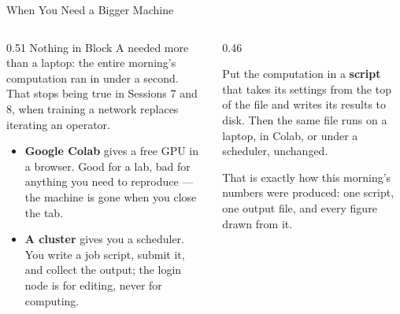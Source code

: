 \begin{frame}{When You Need a Bigger Machine}
\begin{columns}[T]
\begin{column}{0.51\textwidth}
\small
Nothing in Block A needed more than a laptop: the entire morning's computation ran in under a second. That stops being true in Sessions 7 and 8, when training a network replaces iterating an operator.
\medskip
\begin{itemize}\footnotesize
  \item \textbf{Google Colab} gives a free GPU in a browser. Good for a lab, bad for anything you need to reproduce --- the machine is gone when you close the tab.
  \item \textbf{A cluster} gives you a scheduler. You write a job script, submit it, and collect the output; the login node is for editing, never for computing.
\end{itemize}
\end{column}
\begin{column}{0.46\textwidth}
\begin{takeawaybox}[title=\textbf{The portable habit}]\small
Put the computation in a \textbf{script} that takes its settings from the top of the file and writes its results to disk. Then the same file runs on a laptop, in Colab, or under a scheduler, unchanged.
\end{takeawaybox}
\medskip
\begin{examplebox}\footnotesize
That is exactly how this morning's numbers were produced: one script, one output file, and every figure drawn from it.
\end{examplebox}
\end{column}
\end{columns}
\vspace{1mm}
\end{frame}

